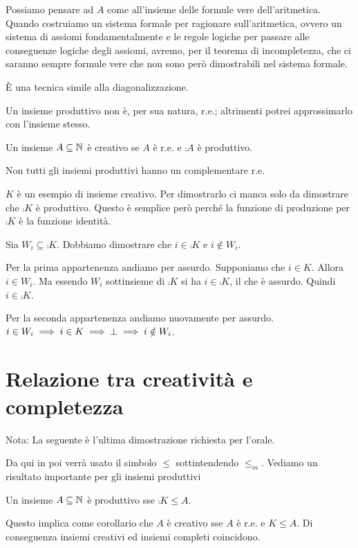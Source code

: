 Possiamo pensare ad $A$ come all'insieme delle formule vere dell'aritmetica. Quando costruiamo un
sistema formale per ragionare sull'aritmetica, ovvero un sistema di assiomi fondamentalmente e le regole
logiche per passare alle conseguenze logiche degli assiomi, avremo, per il teorema di incompletezza,
che ci saranno sempre formule vere che non sono però dimostrabili nel sistema formale.

È una tecnica simile alla diagonalizzazione.

Un insieme produttivo non è, per sua natura, r.e.; altrimenti potrei approssimarlo con l'insieme
stesso.

\begin{defn}
    Un insieme $A \subseteq \mathbb{N}$ è creativo se $A$ è r.e. e $\comp{A}$ è produttivo.
\end{defn}

Non tutti gli insiemi produttivi hanno un complementare r.e.

$K$ è un esempio di insieme creativo. Per dimostrarlo ci manca solo da dimostrare che $\comp{K}$ è
produttivo. Questo è semplice però perché la funzione di produzione per $\comp{K}$ è la funzione
identità.

Sia $W_{i} \subseteq \comp{K}$. Dobbiamo dimostrare che $i \in \comp{K}$ e $i \notin W_{i}$.

Per la prima appartenenza andiamo per assurdo. Supponiamo che $i \in K$. Allora $i \in W_{i}$. Ma
essendo $W_{i}$ sottinsieme di $\comp{K}$ si ha $i \in \comp{K}$, il che è assurdo. Quindi $i \in
\comp{K}$.

Per la seconda appartenenza andiamo nuovamente per assurdo. $i \in W_{i} \implies i \in K \implies
\bot \implies i \notin W_{i}$.

\section{Relazione tra creatività e completezza}

Nota: La seguente è l'ultima dimostrazione richiesta per l'orale.

Da qui in poi verrà usato il simbolo $\leq$ sottintendendo $\leq_{m}$. Vediamo un risultato
importante per gli insiemi produttivi

\begin{thm}
    Un insieme $A \subseteq \mathbb{N}$ è produttivo sse $\comp{K} \leq A$.
\end{thm}

Questo implica come corollario che $A$ è creativo sse $A$ è r.e. e $K \leq A$. Di conseguenza
insiemi creativi ed insiemi completi coincidono.

